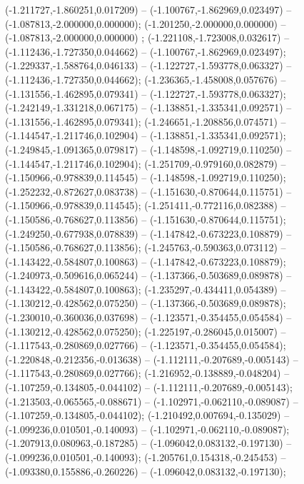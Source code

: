  (-1.211727,-1.860251,0.017209) -- (-1.100767,-1.862969,0.023497) -- (-1.087813,-2.000000,0.000000);
 (-1.201250,-2.000000,0.000000) -- (-1.087813,-2.000000,0.000000) ;
 (-1.221108,-1.723008,0.032617) -- (-1.112436,-1.727350,0.044662) -- (-1.100767,-1.862969,0.023497);
 (-1.229337,-1.588764,0.046133) -- (-1.122727,-1.593778,0.063327) -- (-1.112436,-1.727350,0.044662);
 (-1.236365,-1.458008,0.057676) -- (-1.131556,-1.462895,0.079341) -- (-1.122727,-1.593778,0.063327);
 (-1.242149,-1.331218,0.067175) -- (-1.138851,-1.335341,0.092571) -- (-1.131556,-1.462895,0.079341);
 (-1.246651,-1.208856,0.074571) -- (-1.144547,-1.211746,0.102904) -- (-1.138851,-1.335341,0.092571);
 (-1.249845,-1.091365,0.079817) -- (-1.148598,-1.092719,0.110250) -- (-1.144547,-1.211746,0.102904);
 (-1.251709,-0.979160,0.082879) -- (-1.150966,-0.978839,0.114545) -- (-1.148598,-1.092719,0.110250);
 (-1.252232,-0.872627,0.083738) -- (-1.151630,-0.870644,0.115751) -- (-1.150966,-0.978839,0.114545);
 (-1.251411,-0.772116,0.082388) -- (-1.150586,-0.768627,0.113856) -- (-1.151630,-0.870644,0.115751);
 (-1.249250,-0.677938,0.078839) -- (-1.147842,-0.673223,0.108879) -- (-1.150586,-0.768627,0.113856);
 (-1.245763,-0.590363,0.073112) -- (-1.143422,-0.584807,0.100863) -- (-1.147842,-0.673223,0.108879);
 (-1.240973,-0.509616,0.065244) -- (-1.137366,-0.503689,0.089878) -- (-1.143422,-0.584807,0.100863);
 (-1.235297,-0.434411,0.054389) -- (-1.130212,-0.428562,0.075250) -- (-1.137366,-0.503689,0.089878);
 (-1.230010,-0.360036,0.037698) -- (-1.123571,-0.354455,0.054584) -- (-1.130212,-0.428562,0.075250);
 (-1.225197,-0.286045,0.015007) -- (-1.117543,-0.280869,0.027766) -- (-1.123571,-0.354455,0.054584);
 (-1.220848,-0.212356,-0.013638) -- (-1.112111,-0.207689,-0.005143) -- (-1.117543,-0.280869,0.027766);
 (-1.216952,-0.138889,-0.048204) -- (-1.107259,-0.134805,-0.044102) -- (-1.112111,-0.207689,-0.005143);
 (-1.213503,-0.065565,-0.088671) -- (-1.102971,-0.062110,-0.089087) -- (-1.107259,-0.134805,-0.044102);
 (-1.210492,0.007694,-0.135029) -- (-1.099236,0.010501,-0.140093) -- (-1.102971,-0.062110,-0.089087);
 (-1.207913,0.080963,-0.187285) -- (-1.096042,0.083132,-0.197130) -- (-1.099236,0.010501,-0.140093);
 (-1.205761,0.154318,-0.245453) -- (-1.093380,0.155886,-0.260226) -- (-1.096042,0.083132,-0.197130);
